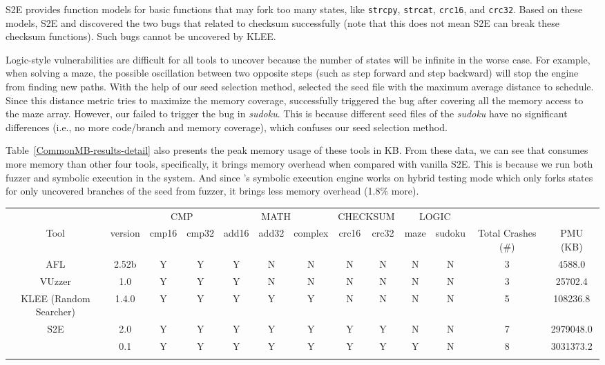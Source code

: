S2E provides function models for basic functions that may fork too 
many states, like \texttt{strcpy}, \texttt{strcat}, \texttt{crc16},
and \texttt{crc32}. Based on these models, S2E and \prototype 
discovered the two bugs that related to checksum successfully 
(note that this does not mean S2E can break these checksum functions). 
Such bugs cannot be uncovered by KLEE. 

Logic-style vulnerabilities are difficult for all tools to uncover 
because the number of states will be infinite in the worse case.
For example, when solving a maze, the possible oscillation between 
two opposite steps (such as step forward and step backward) 
will stop the engine from finding new paths.
With the help of our seed selection method, \prototype selected 
the seed file with the maximum average distance to schedule. 
Since this distance metric tries to maximize the memory coverage, 
\prototype successfully triggered the bug after covering all 
the memory access to the maze array. 
However, our \prototype failed to trigger the bug in \textit{sudoku}. 
This is because different seed files of the \textit{sudoku} have no 
significant differences (i.e., no more code/branch and memory coverage), 
which confuses our seed selection method.

Table~\ref{CommonMB-results-detail} also presents the peak memory usage
of these tools in KB. From these data, we can see that \prototype consumes
more memory than other four tools, specifically, it brings memory
overhead when compared with vanilla S2E. This is because we run both fuzzer and
symbolic execution in the system. And since \prototype's symbolic execution engine
works on hybrid testing mode which only forks states for only uncovered branches of 
the seed from fuzzer, it brings less memory overhead (1.8\% more).

\begin{table}[!t]
{\begin{tabular*}{20pc}{ccccccccccccc}\toprule
	&& \multicolumn{2}{c}{CMP}  & \multicolumn{3}{c}{MATH} & \multicolumn{2}{c}{CHECKSUM} 
	& 	\multicolumn{2}{c}{LOGIC} && \\ 
	    Tool & version & cmp16 & cmp32 & add16 & add32 & complex & crc16 & 
	    crc32 & maze & sudoku & Total Crashes (\#) & PMU (KB)\\
\midrule
		AFL 		& 2.52b		& Y & Y & Y & N & N & N & N & N & N & 3 & 4588.0\\
		VUzzer      & 1.0       & Y & Y & Y & N & N & N & N & N & N & 3 & 25702.4\\
		KLEE (Random Searcher)		& 1.4.0		& Y & Y & Y & Y & Y & N & N & N & N & 5 & 108236.8\\
		S2E			& 2.0		& Y & Y & Y & Y & Y & Y & Y & N & N & 7 & 2979048.0\\
		\prototype	& 0.1		& Y & Y & Y & Y & Y & Y & Y & Y & N & 8 & 3031373.2\\
\botrule
\end{tabular*}}{}
\end{table}

